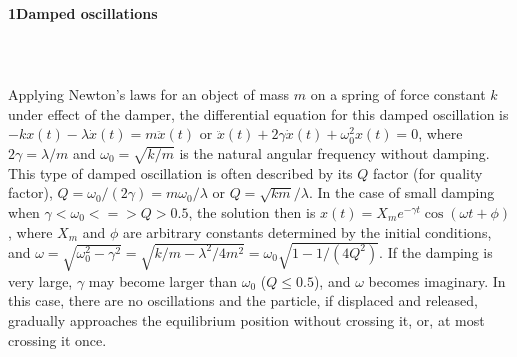 \documentclass[a4paper,12pt,oneside]{report}
\newenvironment{tree}[4]{
\begin{list}{#1}{\parskip=0in \topsep=0in \itemsep=0in \parsep=0in \partopsep=0in \leftmargin=#2 \rightmargin=#3 \itemindent=#4 \listparindent=\itemindent}
}{\end{list}}
\newenvironment{ssection}[5]{
\phantom{#1}\textbf{#2\space#3}
\begin{tree}{#4}{0in}{0in}{#5}
}{\end{tree}}
\begin{document}
\begin{ssection}{\quad}{1}{Damped oscillations}{\textbullet}{\parindent}
\begin{tabular}{lp{}l}
\end{tabular}\\
\item Applying Newton's laws for an object of mass $m$ on a spring of force constant $k$ under effect of the damper, the differential equation for this damped oscillation is $-kx(t)-\lambda\dot{x}(t)=m\ddot{x}(t)$ or $\ddot{x}(t)+2\gamma\dot{x}(t)+\omega_{0}^{2}x(t)=0$, where $2\gamma=\lambda/m$ and $\omega_{0}=\sqrt{k/m}$ is the natural angular frequency without damping. This type of damped oscillation is often described by its $Q$ factor (for quality factor), $Q=\omega_{0}/(2\gamma)=m\omega_{0}/\lambda$ or $Q=\sqrt{km}/\lambda$. In the case of small damping when $\gamma<\omega_{0}<=>Q>0.5$, the solution then is $x(t)=X_{m}e^{-\gamma t}\cos(\omega t+\phi)$, where $X_{m}$ and $\phi$ are arbitrary constants determined by the initial conditions, and $\omega=\sqrt{\omega_{0}^{2}-\gamma^{2}}=\sqrt{k/m-\lambda^{2}/4m^{2}}=\omega_{0}\sqrt{1-1/(4Q^{2})}$. If the damping is very large, $\gamma$ may become larger than $\omega_{0}$ ($Q\leq0.5$), and $\omega$ becomes imaginary. In this case, there are no oscillations and the particle, if displaced and released, gradually approaches the equilibrium position without crossing it, or, at most crossing it once. 
\end{ssection}\
\end{document}
